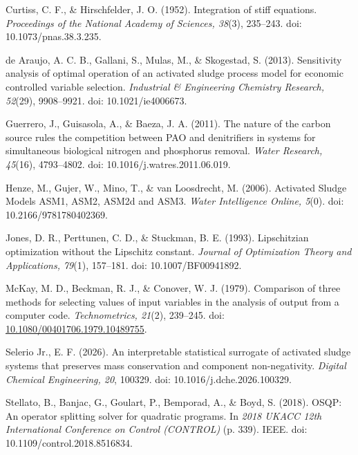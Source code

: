 \documentclass[a4paper,fleqn]{cas-sc}
\begin{document}
\noindent Curtiss, C. F., \& Hirschfelder, J. O. (1952). Integration of stiff equations. \textit{Proceedings of the National Academy of Sciences, 38}(3), 235--243. doi: 10.1073/pnas.38.3.235.

\noindent de Araujo, A. C. B., Gallani, S., Mulas, M., \& Skogestad, S. (2013). Sensitivity analysis of optimal operation of an activated sludge process model for economic controlled variable selection. \textit{Industrial \& Engineering Chemistry Research, 52}(29), 9908--9921. doi: 10.1021/ie4006673.

\noindent Guerrero, J., Guisasola, A., \& Baeza, J. A. (2011). The nature of the carbon source rules the competition between PAO and denitrifiers in systems for simultaneous biological nitrogen and phosphorus removal. \textit{Water Research, 45}(16), 4793--4802. doi: 10.1016/j.watres.2011.06.019.

\noindent Henze, M., Gujer, W., Mino, T., \& van Loosdrecht, M. (2006). Activated Sludge Models ASM1, ASM2, ASM2d and ASM3. \textit{Water Intelligence Online, 5}(0). doi: 10.2166/9781780402369.

\noindent Jones, D. R., Perttunen, C. D., \& Stuckman, B. E. (1993). Lipschitzian optimization without the Lipschitz constant. \textit{Journal of Optimization Theory and Applications, 79}(1), 157--181. doi: 10.1007/BF00941892.

\noindent McKay, M. D., Beckman, R. J., \& Conover, W. J. (1979). Comparison of three methods for selecting values of input variables in the analysis of output from a computer code. \textit{Technometrics, 21}(2), 239--245. doi: \url{10.1080/00401706.1979.10489755}.

\noindent Selerio Jr., E. F. (2026). An interpretable statistical surrogate of activated sludge systems that preserves mass conservation and component non-negativity. \textit{Digital Chemical Engineering, 20}, 100329. doi: 10.1016/j.dche.2026.100329.

\noindent Stellato, B., Banjac, G., Goulart, P., Bemporad, A., \& Boyd, S. (2018). OSQP: An operator splitting solver for quadratic programs. In \textit{2018 UKACC 12th International Conference on Control (CONTROL)} (p. 339). IEEE. doi: 10.1109/control.2018.8516834.
\end{document}
